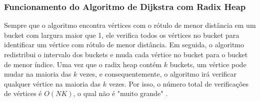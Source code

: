 \subsubsection{Funcionamento do Algoritmo de Dijkstra com Radix Heap}
Sempre que o algoritmo encontra vértices com o rótulo de menor distância em um bucket com
largura maior que 1, ele verifica todos os vértices no bucket para identificar um vértice com rótulo de menor distância.
Em seguida, o algoritmo redistribui o intervalo dos buckets e muda cada vértice no bucket para o bucket de menor índice.
Uma vez que o radix heap contém $k$ buckets, um vértice pode mudar na maioria das $k$ vezes, e consequentemente,
o algoritmo irá verificar qualquer vértice na maioria das $k$ vezes. Por isso, o número total de verificações
de vértices é $O(NK)$, o qual não é "muito grande" \cite{bookahuja}.

